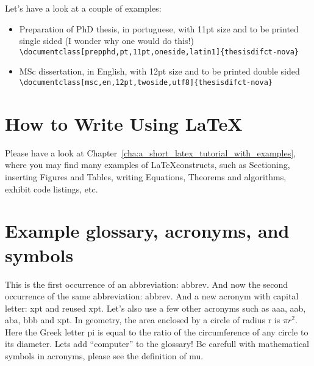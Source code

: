 Let's have a look at a couple of examples:

\begin{itemize}
  \item Preparation of PhD thesis, in portuguese, with 11pt size and to be printed single sided (I wonder why one would do this!)\\
  \verb!\documentclass[prepphd,pt,11pt,oneside,latin1]{thesisdifct-nova}!
  \item MSc dissertation, in English, with 12pt size and to be printed double sided\\
  \verb!\documentclass[msc,en,12pt,twoside,utf8]{thesisdifct-nova}!
\end{itemize}

\section{How to Write Using \LaTeX}
\label{sec:how_to_write_using_latex}

Please have a look at Chapter~\ref{cha:a_short_latex_tutorial_with_examples}, where you may find many examples of \LaTeX constructs, such as Sectioning, inserting Figures and Tables, writing Equations, Theorems and algorithms, exhibit code listings, etc.




\section{Example glossary, acronyms, and symbols}
%
%
This is the first occurrence of an abbreviation: \gls{abbrev}. And now the second occurrence of the same abbreviation: \gls{abbrev}. And a new acronym with capital letter: \Gls{xpt} and reused \gls{xpt}.  Let's also use a few other acronyms such as \gls{aaa}, \gls{aab}, \gls{aba}, \gls{bbb} and \gls{xpt}.
In geometry, the area enclosed by a circle of radius \gls{r} is $\pi r^2$. Here the Greek letter \gls{pi} is equal to the ratio of the circumference of any circle to its diameter.
Lets add ``\gls{computer}'' to the glossary! Be carefull with mathematical symbols in acronyms, please see the definition of \gls{mu}.
%



